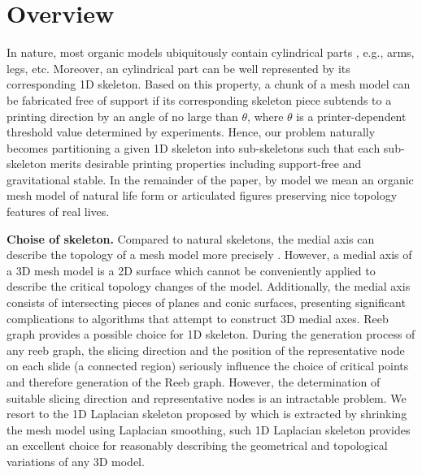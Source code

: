 \section{Overview}

In nature, most organic models ubiquitously contain cylindrical parts \cite{Zhou:2015:GCD}, e.g., arms, legs, etc. Moreover, an cylindrical part can be well represented by its corresponding 1D skeleton. Based on this property, a chunk of a mesh model can be fabricated free of support if its corresponding skeleton piece subtends to a printing direction by an angle of no large than $\theta$, where $\theta$ is a printer-dependent threshold value determined by experiments. Hence, our problem naturally becomes partitioning a given 1{D} skeleton into sub-skeletons such that each sub-skeleton merits desirable printing properties including support-free and gravitational stable. In the remainder of the paper, by model we mean an organic mesh model of natural life form or articulated figures preserving nice topology features of real lives.

\textbf{Choise of skeleton.} Compared to natural skeletons, the medial axis can describe the topology of a mesh model more precisely \cite{ZhangXWYTW15}. However, a medial axis of a 3D mesh model is a 2D surface which cannot be conveniently applied to describe the critical topology changes of the model. Additionally, the medial axis consists of intersecting pieces of planes and conic surfaces, presenting significant complications to algorithms that attempt to construct 3D medial axes.
Reeb graph provides a possible choice for 1D skeleton. During the generation process of any reeb graph, the slicing direction and the position of the representative node on each slide (a connected region) seriously influence the choice of critical points and therefore generation of the Reeb graph. However, the determination of suitable slicing direction and representative nodes is an intractable problem. We resort to the 1D Laplacian skeleton proposed by \cite{AuTCCL08} which is extracted by shrinking the mesh model using Laplacian smoothing, such 1D Laplacian skeleton provides an excellent choice for reasonably describing the geometrical and topological variations of any 3{D} model.





